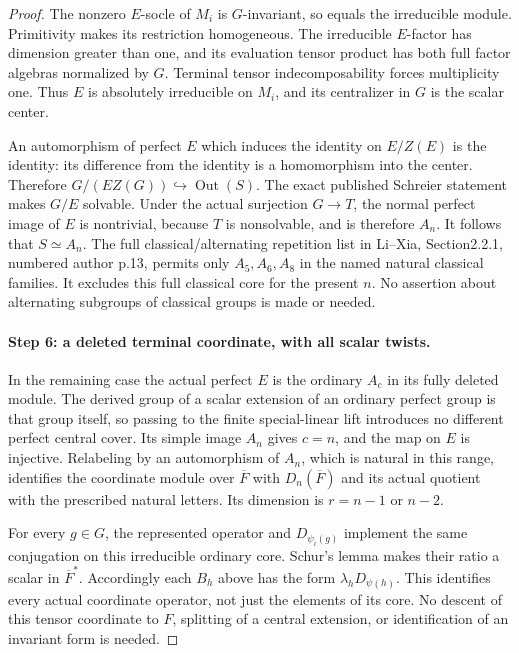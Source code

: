\begin{proof}
The nonzero $E$-socle of $M_i$ is $G$-invariant, so equals the
irreducible module.  Primitivity makes its restriction homogeneous.
The irreducible $E$-factor has dimension greater than one, and
its evaluation tensor product has both full factor algebras
normalized by $G$.  Terminal tensor indecomposability forces
multiplicity one.  Thus $E$ is absolutely irreducible on $M_i$,
and its centralizer in $G$ is the scalar center.

An automorphism of perfect $E$ which induces the identity on
$E/Z(E)$ is the identity: its difference from the identity is
a homomorphism into the center.  Therefore
$G/(EZ(G))\hookrightarrow\operatorname{Out}(S)$.
The exact published Schreier statement makes $G/E$ solvable.
\cite[Theorem2.3, p.~1314]{HD:BabaiLuksSeress1997}
Under the actual surjection $G\to T$, the normal perfect image
of $E$ is nontrivial, because $T$ is nonsolvable, and is therefore
$A_n$.  It follows that $S\simeq A_n$.
The full classical/alternating repetition list in Li--Xia,
Section2.2.1, numbered author p.13, permits only $A_5,A_6,A_8$
in the named natural classical families.\cite{HES:LiXia2022}
It excludes this full classical core for the present $n$.
No assertion about alternating subgroups of classical groups
is made or needed.

\paragraph{Step 6: a deleted terminal coordinate, with all scalar twists.}
In the remaining case the actual perfect $E$ is the ordinary
$A_c$ in its fully deleted module.  The derived group of a
scalar extension of an ordinary perfect group is that group
itself, so passing to the finite special-linear lift introduces
no different perfect central cover.  Its simple image $A_n$
gives $c=n$, and the map on $E$ is injective.  Relabeling by
an automorphism of $A_n$, which is natural in this range,
identifies the coordinate module over $\overline F$ with
$D_n(\overline F)$ and its actual quotient with the prescribed
natural letters.  Its dimension is $r=n-1$ or $n-2$.

For every $g\in G$, the represented operator and
$D_{\psi_i(g)}$ implement the same conjugation on this
irreducible ordinary core.  Schur's lemma makes their ratio
a scalar in $\overline F^*$.  Accordingly each $B_h$ above
has the form $\lambda_hD_{\psi(h)}$.  This identifies every
actual coordinate operator, not just the elements of its core.
No descent of this tensor coordinate to $F$, splitting of a
central extension, or identification of an invariant form is needed.


\end{proof}
